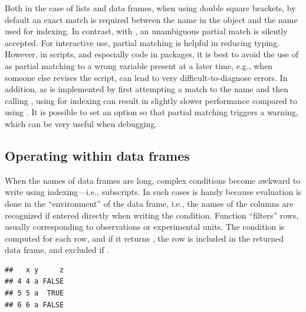 \documentclass[krantz2]{krantz}\usepackage{knitr}
\begin{document}
\begin{warningbox}
Both in the case of lists and data frames, when using double square brackets, by default an exact match is required between the name in the object and the name used for indexing. In contrast, with \Roperator{\$}, an unambiguous partial match is silently accepted. For interactive use, partial matching is helpful in reducing typing. However, in scripts, and especially \Rlang code in packages, it is best to avoid the use of \Roperator{\$} as partial matching to a wrong variable present at a later time, e.g., when someone else revises the script, can lead to very difficult-to-diagnose errors. In addition, as \Roperator{\$} is implemented by first attempting a match to the name and then calling \Roperator{[[ ]]}, using \Roperator{\$} for indexing can result in slightly slower performance compared to using \Roperator{[[ ]]}. It is possible to set an \Rlang option so that partial matching triggers a warning, which can be very useful when debugging.
\end{warningbox}

\subsection{Operating within data frames}\label{sec:calc:df:with}
When the names of data frames are long, complex conditions become awkward to write using indexing---i.e., subscripts. In such cases  is handy because evaluation is done in the ``environment'' of the data frame, i.e., the names of the columns are recognized if entered directly when writing the condition. Function   ``filters'' rows, usually corresponding to observations or experimental units. The condition is computed for each row, and if it returns , the row is included in the returned data frame, and excluded if .

\begin{knitrout}\footnotesize
{}\color{fgcolor}\begin{kframe}
\begin{alltt}
 \hlkwb{<-} \hlstd{(} \hlstd{=} \hlopt{:}\hlstd{,}  \hlstd{=} \hlstd{,}  \hlstd{=} \hlstd{(}\hlstd{,} \hlstd{))}
 \hlopt{>} \hlstd{)}
\end{alltt}
\begin{verbatim}
##   x y     z
## 4 4 a FALSE
## 5 5 a  TRUE
## 6 6 a FALSE
\end{verbatim}
\end{kframe}
\end{knitrout}
\end{document}
